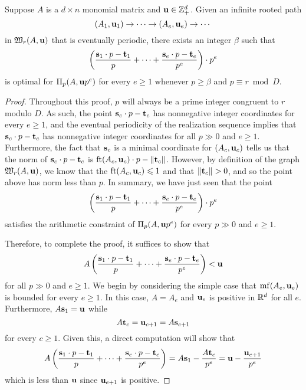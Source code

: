 \documentclass[11pt]{amsart}
\renewcommand{\!}[1]{{\color{red}\text{$\star$\,}#1\,$\star$}}
\begin{document}
\newpage


\begin{proposition}
Suppose $A$ is a $d \times n$ monomial matrix and $\mathbf{u} \in \mathbb{Z}^d_+$.  Given an infinite rooted path 
\[ (A_1, \mathbf{u}_1) \to \cdots \to (A_e, \mathbf{u}_e) \to \cdots \] in $\mathfrak{W}_r(A, \mathbf{u})$ 
that is eventually periodic, there exists an integer $\beta$ such that 
\[  \left( \frac{ \mathbf{s}_1 \cdot p - \mathbf{t}_1}{p} + \cdots + \frac{ \mathbf{s}_e \cdot p - \mathbf{t}_e}{p^e} \right) \cdot p^e \] 
is optimal for $\Pi_p(A, \mathbf{u}p^e)$ for every $e \geq 1$ whenever $p \geq \beta$ and $p \equiv r \bmod D$.
\end{proposition}

\begin{proof}   Throughout this proof, $p$ will always be a prime integer congruent to $r$ modulo $D$.  As such, the point $\mathbf{s}_c \cdot p - \mathbf{t}_c$  has nonnegative integer coordinates for every $e \geq 1$, and the eventual periodicity of the realization sequence implies that $\mathbf{s}_c \cdot p - \mathbf{t}_c$ has nonnegative integer coordinates for all $p \gg 0$ and $e \geq 1$.   Furthermore, the fact that $\mathbf{s}_c$ is a minimal coordinate for $(A_c, \mathbf{u}_c)$ tells us that the norm of $\mathbf{s}_c \cdot p - \mathbf{t}_c$ is $\operatorname{ft}(A_c, \mathbf{u}_c) \cdot p - \| \mathbf{t}_c \|$.  However, by definition of the graph $\mathfrak{W}_r(A, \mathbf{u})$, we know that the $\operatorname{ft}(A_c, \mathbf{u}_c) \leqslant 1$ and that $\| \mathbf{t}_c \| > 0$, and so the point above has norm less than $p$.  In summary, we have just seen that the point
\[  \left( \frac{ \mathbf{s}_1 \cdot p - \mathbf{t}_1}{p} + \cdots + \frac{ \mathbf{s}_e \cdot p - \mathbf{t}_e}{p^e} \right) \cdot p^e \] satisfies the arithmetic constraint of $\Pi_p(A, \mathbf{u}p^e)$ for every $p \gg 0$ and $e \geq 1$.  

Therefore, to complete the proof, it suffices to show that 
\begin{equation}
\label{goal: e}
A   \left( \frac{ \mathbf{s}_1 \cdot p - \mathbf{t}_1}{p} + \cdots + \frac{ \mathbf{s}_e \cdot p - \mathbf{t}_e}{p^e} \right) < \mathbf{u} 
\end{equation}
for all $p \gg 0$ and $e \geq 1$.  We begin by considering the simple case that $\operatorname{mf}(A_e, \mathbf{u}_e)$ is bounded for every $e \geq 1$.  In this case, $A = A_e$ and $\mathbf{u}_e$ is positive in $\mathbb{R}^d$ for all $e$.  Furthermore, $A \mathbf{s}_1 = \mathbf{u}$ while \[ A \mathbf{t}_c = \mathbf{u}_{c+1} = A \mathbf{s}_{c+1} \] for every $c \geq 1$.   Given this, a direct computation will show that 
\[ A   \left( \frac{ \mathbf{s}_1 \cdot p - \mathbf{t}_1}{p} + \cdots + \frac{ \mathbf{s}_e \cdot p - \mathbf{t}_e}{p^e} \right)  = A \mathbf{s}_1 - \frac{A \mathbf{t}_e}{p^e} = \mathbf{u} - \frac{\mathbf{u}_{e+1}}{p^e} \] which is less than $\mathbf{u}$ since $\mathbf{u}_{e+1}$ is positive.  




\end{proof}
\end{document}
